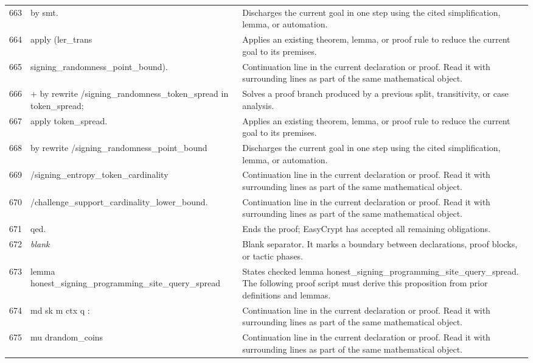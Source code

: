 \documentclass[10pt]{article}
\begin{document}
\begin{longtable}{r L{0.53\textwidth} L{0.37\textwidth}}
663 & {\ttfamily\scriptsize   by smt.} & Discharges the current goal in one step using the cited simplification, lemma, or automation. \\
664 & {\ttfamily\scriptsize apply (ler\_trans} & Applies an existing theorem, lemma, or proof rule to reduce the current goal to its premises. \\
665 & {\ttfamily\scriptsize   signing\_randomness\_point\_bound).} & Continuation line in the current declaration or proof.  Read it with surrounding lines as part of the same mathematical object. \\
666 & {\ttfamily\scriptsize + by rewrite /signing\_randomness\_token\_spread in token\_spread;} & Solves a proof branch produced by a previous split, transitivity, or case analysis. \\
667 & {\ttfamily\scriptsize      apply token\_spread.} & Applies an existing theorem, lemma, or proof rule to reduce the current goal to its premises. \\
668 & {\ttfamily\scriptsize by rewrite /signing\_randomness\_point\_bound} & Discharges the current goal in one step using the cited simplification, lemma, or automation. \\
669 & {\ttfamily\scriptsize            /signing\_entropy\_token\_cardinality} & Continuation line in the current declaration or proof.  Read it with surrounding lines as part of the same mathematical object. \\
670 & {\ttfamily\scriptsize            /challenge\_support\_cardinality\_lower\_bound.} & Continuation line in the current declaration or proof.  Read it with surrounding lines as part of the same mathematical object. \\
671 & {\ttfamily\scriptsize qed.} & Ends the proof; EasyCrypt has accepted all remaining obligations. \\
672 & {\ttfamily\scriptsize \emph{blank}} & Blank separator.  It marks a boundary between declarations, proof blocks, or tactic phases. \\
673 & {\ttfamily\scriptsize lemma honest\_signing\_programming\_site\_query\_spread} & States checked lemma honest\_signing\_programming\_site\_query\_spread.  The following proof script must derive this proposition from prior definitions and lemmas. \\
674 & {\ttfamily\scriptsize   md sk m ctx q :} & Continuation line in the current declaration or proof.  Read it with surrounding lines as part of the same mathematical object. \\
675 & {\ttfamily\scriptsize   mu drandom\_coins} & Continuation line in the current declaration or proof.  Read it with surrounding lines as part of the same mathematical object. \\

\end{longtable}
\end{document}
